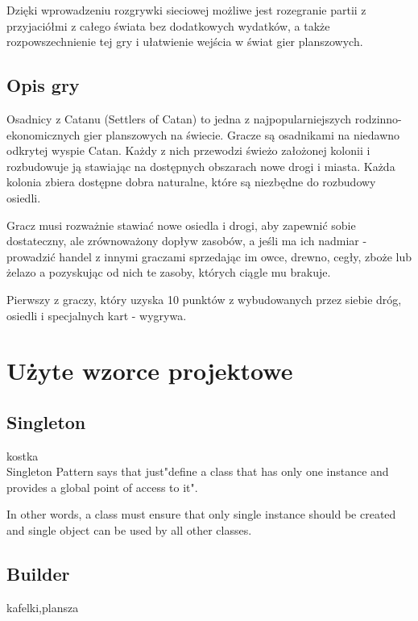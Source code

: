 \documentclass[a4paper, 11pt]{article}
\begin{document}
	Dzięki wprowadzeniu rozgrywki sieciowej możliwe jest rozegranie partii z przyjaciółmi z całego świata bez dodatkowych wydatków, a także rozpowszechnienie tej gry i ułatwienie wejścia w świat gier planszowych. 
	\subsection{Opis gry}
	\indent
	
Osadnicy z Catanu (Settlers of Catan) to jedna z najpopularniejszych rodzinno-ekonomicznych gier planszowych na świecie. 
Gracze są osadnikami na niedawno odkrytej wyspie Catan. Każdy z nich przewodzi świeżo założonej kolonii i rozbudowuje ją stawiając na dostępnych obszarach nowe drogi i miasta. Każda kolonia zbiera dostępne dobra naturalne, które są niezbędne do rozbudowy osiedli.
 
Gracz musi rozważnie stawiać nowe osiedla i drogi, aby zapewnić sobie dostateczny, ale zrównoważony dopływ zasobów, a jeśli ma ich nadmiar - prowadzić handel z innymi graczami sprzedając im owce, drewno, cegły, zboże lub żelazo a pozyskując od nich te zasoby, których ciągle mu brakuje.
 
Pierwszy z graczy, który uzyska 10 punktów z wybudowanych przez siebie dróg, osiedli i specjalnych kart - wygrywa.
	

	
	
	
	
	
	\section{Użyte wzorce projektowe}
	\subsection{Singleton}
	kostka \\
	Singleton Pattern says that just"define a class that has only one instance and provides a global point of access to it".

In other words, a class must ensure that only single instance should be created and single object can be used by all other classes.

	\subsection{Builder}
	kafelki,plansza\\
\end{document}
